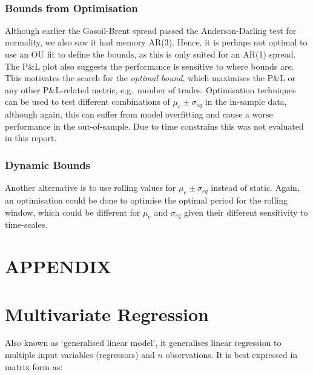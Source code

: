 \documentclass{article}
\begin{document}
    \begin{center}
    \end{center}
    { \hspace*{\fill} \\}
    
    \subsubsection{Bounds from Optimisation}\label{bounds-from-optimisation}

Although earlier the Gasoil-Brent spread passed the Anderson-Darling
test for normality, we also saw it had memory AR(3). Hence, it is
perhaps not optimal to use an OU fit to define the bounds, as this is
only suited for an AR(1) spread. The P\&L plot also suggests the
performance is sensitive to where bounds are. This motivates the search
for the \emph{optimal bound}, which maximises the P\&L or any other
P\&L-related metric, e.g.~number of trades. Optimisation techniques can
be used to test different combinations of \(\mu_e \pm \sigma_{eq}\) in
the in-sample data, although again, this can suffer from model
overfitting and cause a worse performance in the out-of-sample. Due to
time constrains this was not evaluated in this report.

    \subsubsection{Dynamic Bounds}\label{dynamic-bounds}

Another alternative is to use rolling values for
\(\mu_e \pm \sigma_{eq}\) instead of static. Again, an optimisation
could be done to optimise the optimal period for the rolling window,
which could be different for \(\mu_e\) and \(\sigma_{eq}\) given their
different sensitivity to time-scales.

    \section{APPENDIX}\label{appendix}

    \section{Multivariate Regression}\label{multivariate-regression}

Also known as `generalised linear model', it generalises linear
regression to multiple input variables (regressors) and \(n\)
observations. It is best expressed in matrix form as:
\end{document}
